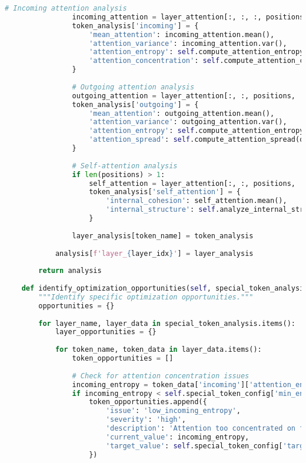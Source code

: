 \begin{lstlisting}[language=Python, caption=Attention pattern analysis and optimization framework]
                # Incoming attention analysis
                incoming_attention = layer_attention[:, :, :, positions]
                token_analysis['incoming'] = {
                    'mean_attention': incoming_attention.mean(),
                    'attention_variance': incoming_attention.var(),
                    'attention_entropy': self.compute_attention_entropy(incoming_attention),
                    'attention_concentration': self.compute_attention_concentration(incoming_attention)
                }
                
                # Outgoing attention analysis
                outgoing_attention = layer_attention[:, :, positions, :]
                token_analysis['outgoing'] = {
                    'mean_attention': outgoing_attention.mean(),
                    'attention_variance': outgoing_attention.var(),
                    'attention_entropy': self.compute_attention_entropy(outgoing_attention),
                    'attention_spread': self.compute_attention_spread(outgoing_attention)
                }
                
                # Self-attention analysis
                if len(positions) > 1:
                    self_attention = layer_attention[:, :, positions, :][:, :, :, positions]
                    token_analysis['self_attention'] = {
                        'internal_cohesion': self_attention.mean(),
                        'internal_structure': self.analyze_internal_structure(self_attention)
                    }
                
                layer_analysis[token_name] = token_analysis
            
            analysis[f'layer_{layer_idx}'] = layer_analysis
        
        return analysis
    
    def identify_optimization_opportunities(self, special_token_analysis):
        """Identify specific optimization opportunities."""
        opportunities = {}
        
        for layer_name, layer_data in special_token_analysis.items():
            layer_opportunities = {}
            
            for token_name, token_data in layer_data.items():
                token_opportunities = []
                
                # Check for attention concentration issues
                incoming_entropy = token_data['incoming']['attention_entropy']
                if incoming_entropy < self.special_token_config['min_entropy_threshold']:
                    token_opportunities.append({
                        'issue': 'low_incoming_entropy',
                        'severity': 'high',
                        'description': 'Attention too concentrated on few sources',
                        'current_value': incoming_entropy,
                        'target_value': self.special_token_config['target_entropy_range']
                    })
                

\end{lstlisting}
